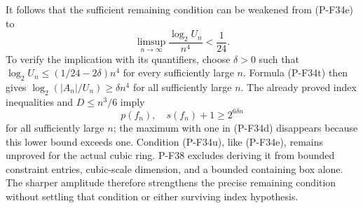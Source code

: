 It follows that the sufficient remaining condition can be
weakened from (P-F34e) to
\[
 \limsup_{n\to\infty}\frac{\log_2 U_n}{n^4}<\frac1{24}.
 \tag{P-F34u}
\]
To verify the implication with its quantifiers, choose
$\delta>0$ such that
$\log_2 U_n\le(1/24-2\delta)n^4$ for every sufficiently
large $n$. Formula (P-F34t) then gives
$\log_2(|A_n|/U_n)\ge\delta n^4$ for all sufficiently
large $n$. The already proved index inequalities and
$D\le n^3/6$ imply
\[
                   p(f_n),\quad s(f_n)+1\ge2^{6\delta n}
\]
for all sufficiently large $n$; the maximum with one in
(P-F34d) disappears because this lower bound exceeds one.
Condition (P-F34u), like (P-F34e), remains unproved for the
actual cubic ring. P-F38 excludes deriving it from bounded
constraint entries, cubic-scale dimension, and a bounded
containing box alone. The sharper amplitude therefore
strengthens the precise remaining condition without settling
that condition or either surviving index hypothesis.
